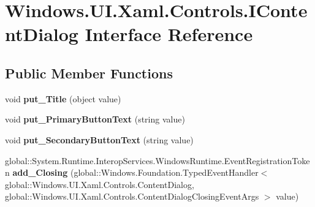\hypertarget{interface_windows_1_1_u_i_1_1_xaml_1_1_controls_1_1_i_content_dialog}{}\section{Windows.\+U\+I.\+Xaml.\+Controls.\+I\+Content\+Dialog Interface Reference}
\label{interface_windows_1_1_u_i_1_1_xaml_1_1_controls_1_1_i_content_dialog}
\subsection*{Public Member Functions}
\begin{DoxyCompactItemize}
\item 
\mbox{\label{interface_windows_1_1_u_i_1_1_xaml_1_1_controls_1_1_i_content_dialog_afc276f713f3e2b87b2c5dee06ae15a45}} 
void {\bfseries put\+\_\+\+Title} (object value)
\item 
\mbox{\label{interface_windows_1_1_u_i_1_1_xaml_1_1_controls_1_1_i_content_dialog_ab7dd4baecced729d7b0c3c5dd82ccc5d}} 
void {\bfseries put\+\_\+\+Primary\+Button\+Text} (string value)
\item 
\mbox{\label{interface_windows_1_1_u_i_1_1_xaml_1_1_controls_1_1_i_content_dialog_af0c0753281acd52009a7c90aa0651582}} 
void {\bfseries put\+\_\+\+Secondary\+Button\+Text} (string value)
\item 
\mbox{\label{interface_windows_1_1_u_i_1_1_xaml_1_1_controls_1_1_i_content_dialog_a0c90eacfbf19a70c42e7827d75494527}} 
global\+::\+System.\+Runtime.\+Interop\+Services.\+Windows\+Runtime.\+Event\+Registration\+Token {\bfseries add\+\_\+\+Closing} (global\+::\+Windows.\+Foundation.\+Typed\+Event\+Handler$<$ global\+::\+Windows.\+U\+I.\+Xaml.\+Controls.\+Content\+Dialog, global\+::\+Windows.\+U\+I.\+Xaml.\+Controls.\+Content\+Dialog\+Closing\+Event\+Args $>$ value)
\item 
\mbox{\label{interface_windows_1_1_u_i_1_1_xaml_1_1_controls_1_1_i_content_dialog_a39db0b1822764cb6d5c7be9707a44c54}} 

\end{DoxyCompactItemize}
